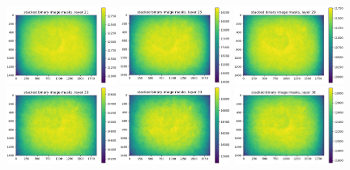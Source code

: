 \documentclass[letterpaper,11pt]{article}
\begin{document}
\begin{figure}[!ht]
\centering
\includegraphics[width=0.32\textwidth]{images/measuring_flatfield_corrections/mask_stack_layers_polaris/mask_stack_layer_21}
\includegraphics[width=0.32\textwidth]{images/measuring_flatfield_corrections/mask_stack_layers_polaris/mask_stack_layer_25}
\includegraphics[width=0.32\textwidth]{images/measuring_flatfield_corrections/mask_stack_layers_polaris/mask_stack_layer_29}
\includegraphics[width=0.32\textwidth]{images/measuring_flatfield_corrections/mask_stack_layers_polaris/mask_stack_layer_30}
\includegraphics[width=0.32\textwidth]{images/measuring_flatfield_corrections/mask_stack_layers_polaris/mask_stack_layer_33}
\includegraphics[width=0.32\textwidth]{images/measuring_flatfield_corrections/mask_stack_layers_polaris/mask_stack_layer_36}

\end{figure}
\end{document}
